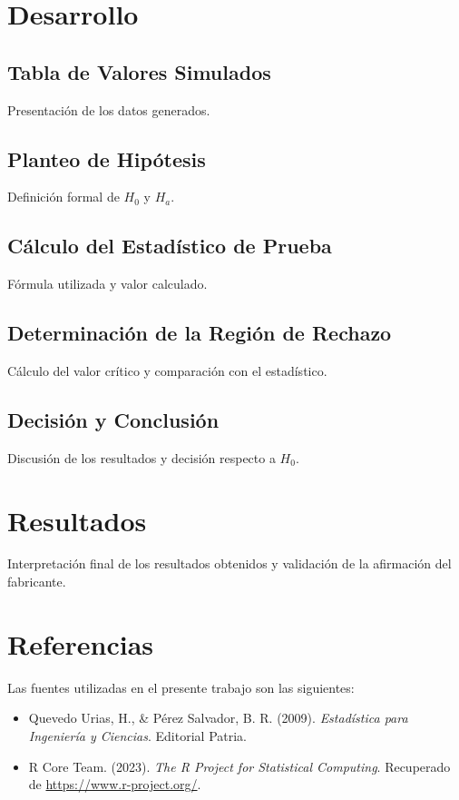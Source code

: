 \documentclass[a4paper,12pt]{article}
\begin{document}
\section{Desarrollo}
\subsection{Tabla de Valores Simulados}
Presentación de los datos generados.
\subsection{Planteo de Hipótesis}
Definición formal de \( H_0 \) y \( H_a \).
\subsection{Cálculo del Estadístico de Prueba}
Fórmula utilizada y valor calculado.
\subsection{Determinación de la Región de Rechazo}
Cálculo del valor crítico y comparación con el estadístico.
\subsection{Decisión y Conclusión}
Discusión de los resultados y decisión respecto a \( H_0 \).

\section{Resultados}
Interpretación final de los resultados obtenidos y validación de la afirmación del fabricante.

\section{Referencias}

Las fuentes utilizadas en el presente trabajo son las siguientes:

\begin{itemize}
    \item Quevedo Urias, H., \& Pérez Salvador, B. R. (2009). \textit{Estadística para Ingeniería y Ciencias}. Editorial Patria.
    \item R Core Team. (2023). \textit{The R Project for Statistical Computing}. Recuperado de \url{https://www.r-project.org/}.
\end{itemize}

\printbibliography
\end{document}
